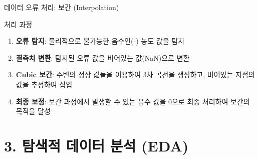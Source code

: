 \documentclass[serif, aspectratio=169]{beamer}
\begin{document}
\begin{frame}{데이터 오류 처리: 보간 (Interpolation)}
    \begin{block}{\small 처리 과정}
        \begin{enumerate}\scriptsize
            \item\textbf{오류 탐지}:
            물리적으로 불가능한 음수인(-) 농도 값을 탐지
            \vspace{0.5cm}
            \item\textbf{결측치 변환}:
            탐지된 오류 값을 비어있는 값(NaN)으로 변환
            \vspace{0.5cm}
            \item\textbf{Cubic 보간}:
            주변의 정상 값들을 이용하여 3차 곡선을 생성하고, 비어있는 지점의 값을 추정하여 삽입
            \vspace{0.5cm}
            \item\textbf{최종 보정}:
            보간 과정에서 발생할 수 있는 음수 값을 0으로 최종 처리하여 보간의 목적을 달성
        \end{enumerate}
    \end{block}
\end{frame}

\section{3. 탐색적 데이터 분석 (EDA)}
\end{document}
